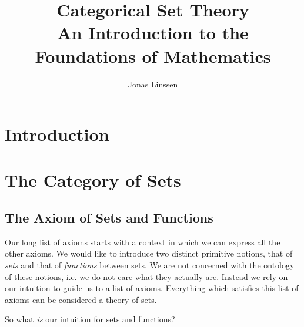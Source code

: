 \documentclass{article}
\title{Categorical Set Theory\\An Introduction to the Foundations of Mathematics}
\author{Jonas Linssen}
\begin{document}
	\maketitle
	\tableofcontents

	\newpage
	\section*{Introduction}


	\newpage
	\section{The Category of Sets}
	\subsection{The Axiom of Sets and Functions}

	Our long list of axioms starts with a context in which we can express all the other axioms. We would like to introduce two distinct primitive notions, that of \textit{sets} and that of \textit{functions} between sets. We are \underline{not} concerned with the ontology of these notions, i.e. we do not care what they actually are. Instead we rely on our intuition to guide us to a list of axioms. Everything which satisfies this list of axioms can be considered a theory of sets.

	So what \textit{is} our intuition for sets and functions?   
\end{document}
